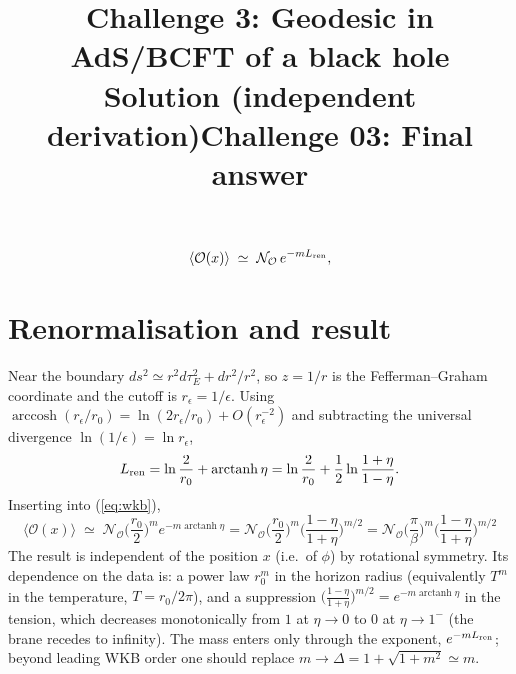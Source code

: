 \documentclass[11pt]{article}
\title{Challenge 3: Geodesic in AdS/BCFT of a black hole \\ \large Solution (independent derivation)}
\date{}
\title{Challenge 03: Final answer}
\author{}
\newcommand{\arctanh}{\operatorname{arctanh}}
\newcommand{\arccosh}{\operatorname{arccosh}}
\begin{document}
\maketitle
\begin{equation}
\langle\mathcal O(x)\rangle\;\simeq\;\mathcal N_{\mathcal O}\,e^{-m L_{\rm ren}},
\label{eq:wkb}
\end{equation}
\section{Renormalisation and result}
Near the boundary $ds^2\simeq r^2d\tau_E^2+dr^2/r^2$, so $z=1/r$ is the Fefferman--Graham coordinate and the cutoff is $r_\epsilon=1/\epsilon$. Using $\arccosh(r_\epsilon/r_0)=\ln(2r_\epsilon/r_0)+O(r_\epsilon^{-2})$ and subtracting the universal divergence $\ln(1/\epsilon)=\ln r_\epsilon$,
\begin{equation}
L_{\rm ren}=\ln\frac{2}{r_0}+\arctanh\eta=\ln\frac{2}{r_0}+\frac12\ln\frac{1+\eta}{1-\eta}.
\end{equation}
Inserting into (\ref{eq:wkb}),
\begin{equation}
\boxed{\;\langle\mathcal O(x)\rangle\;\simeq\;\mathcal N_{\mathcal O}\Big(\frac{r_0}{2}\Big)^{m}e^{-m\arctanh\eta}
=\mathcal N_{\mathcal O}\Big(\frac{r_0}{2}\Big)^{m}\Big(\frac{1-\eta}{1+\eta}\Big)^{m/2}
=\mathcal N_{\mathcal O}\Big(\frac{\pi}{\beta}\Big)^{m}\Big(\frac{1-\eta}{1+\eta}\Big)^{m/2}\;}
\end{equation}
The result is independent of the position $x$ (i.e.\ of $\phi$) by rotational symmetry. Its dependence on the data is: a power law $r_0^{m}$ in the horizon radius (equivalently $T^{m}$ in the temperature, $T=r_0/2\pi$), and a suppression $\big(\frac{1-\eta}{1+\eta}\big)^{m/2}=e^{-m\arctanh\eta}$ in the tension, which decreases monotonically from $1$ at $\eta\to0$ to $0$ at $\eta\to1^-$ (the brane recedes to infinity). The mass enters only through the exponent, $e^{-mL_{\rm ren}}$; beyond leading WKB order one should replace $m\to\Delta=1+\sqrt{1+m^2}\simeq m$.
\end{document}
